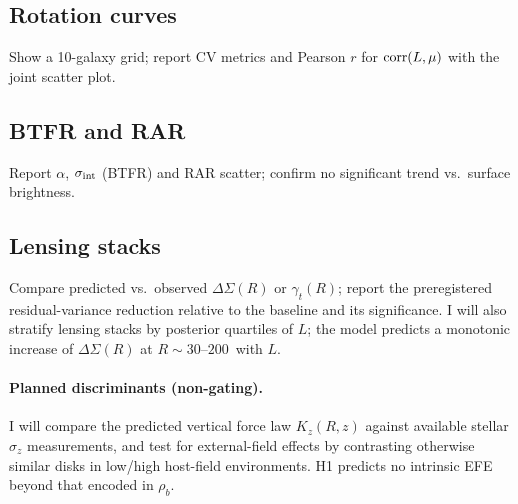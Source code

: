 		\subsection{Rotation curves}
		Show a 10-galaxy grid; report CV metrics and Pearson $r$ for $\mathrm{corr}(L,\mu)$ with the joint scatter plot.
		
		\subsection{BTFR and RAR}
		Report $\alpha$, $\sigma_{\rm int}$ (BTFR) and RAR scatter; confirm no significant trend vs.\ surface brightness.
		
		\subsection{Lensing stacks}
		Compare predicted vs.\ observed $\Delta\Sigma(R)$ or $\gamma_t(R)$; report the preregistered residual-variance reduction relative to the baseline and its significance. I will also stratify lensing stacks by posterior quartiles of $L$; the model predicts a monotonic increase of $\Delta\Sigma(R)$ at $R\sim 30$--$200$\,\si{\kpc} with $L$.
		\paragraph{Planned discriminants (non-gating).}
		I will compare the predicted vertical force law $K_z(R,z)$ against available stellar
		$\sigma_z$ measurements, and test for external-field effects by contrasting otherwise similar
		disks in low/high host-field environments. H1 predicts no intrinsic EFE beyond that encoded in $\rho_b$.
		
